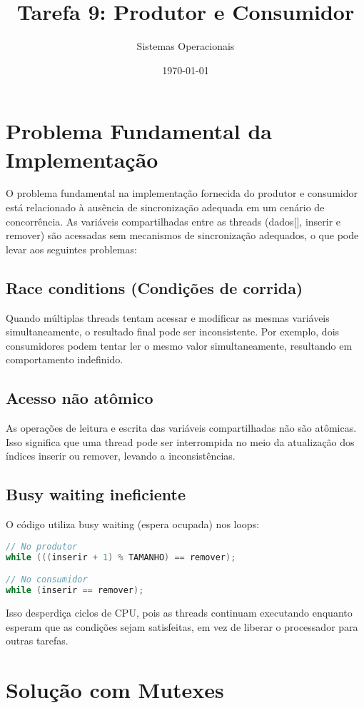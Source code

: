 \documentclass[12pt]{article}
\title{Tarefa 9: Produtor e Consumidor}
\author{Sistemas Operacionais}
\date{\today}
\begin{document}
\maketitle

\section{Problema Fundamental da Implementação}

O problema fundamental na implementação fornecida do produtor e consumidor está relacionado à ausência de sincronização adequada em um cenário de concorrência. As variáveis compartilhadas entre as threads (dados[], inserir e remover) são acessadas sem mecanismos de sincronização adequados, o que pode levar aos seguintes problemas:

\subsection{Race conditions (Condições de corrida)}
Quando múltiplas threads tentam acessar e modificar as mesmas variáveis simultaneamente, o resultado final pode ser inconsistente. Por exemplo, dois consumidores podem tentar ler o mesmo valor simultaneamente, resultando em comportamento indefinido.

\subsection{Acesso não atômico}
As operações de leitura e escrita das variáveis compartilhadas não são atômicas. Isso significa que uma thread pode ser interrompida no meio da atualização dos índices inserir ou remover, levando a inconsistências.

\subsection{Busy waiting ineficiente}
O código utiliza busy waiting (espera ocupada) nos loops:
\begin{lstlisting}[language=C]
// No produtor
while (((inserir + 1) % TAMANHO) == remover);

// No consumidor
while (inserir == remover);
\end{lstlisting}

Isso desperdiça ciclos de CPU, pois as threads continuam executando enquanto esperam que as condições sejam satisfeitas, em vez de liberar o processador para outras tarefas.

\section{Solução com Mutexes}
\end{document}
